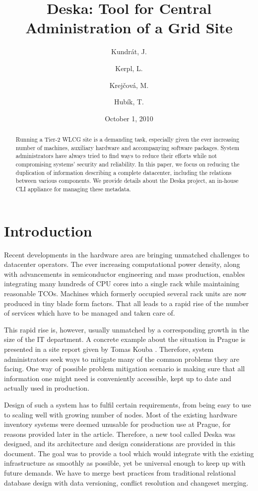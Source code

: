 \documentclass[11pt]{article}
\title{\sc Deska: Tool for Central Administration of a Grid Site}
\author{Kundrát, J.}
\author{Kerpl, L.}
\author{Krejčová, M.}
\author{Hubík, T.}
\affil{Institute of Physics of the AS CR, Prague, Czech Republic}
\date{October 1, 2010}
\begin{document}
\maketitle
 
\begin{abstract}
Running a Tier-2 WLCG site is a demanding task, especially given the ever
increasing number of machines, auxiliary hardware and accompanying software
packages.  System administrators have always tried to find ways to reduce their
efforts while not compromising systems' security and reliability.  In this
paper, we focus on reducing the duplication of information describing a complete
datacenter, including the relations between various components.  We provide
details about the Deska project, an in-house CLI appliance for managing these
metadata.
\end{abstract}


\section{Introduction}

Recent developments in the hardware area are bringing unmatched challenges to
datacenter operators.  The ever increasing computational power density, along
with advancements in semiconductor engineering and mass production, enables
integrating many hundreds of CPU cores into a single rack while maintaining
reasonable TCOs.  Machines which formerly occupied several rack units are now
produced in tiny blade form factors.  That all leads to a rapid rise of the
number of services which have to be managed and taken care of.

This rapid rise is, however, usually unmatched by a corresponding growth in the
size of the IT department.  A concrete example about the situation in Prague is
presented in a site report given by Tomas Kouba \cite{kouba}. Therefore, system
administrators seek ways to mitigate many of the common problems they are
facing.  One way of possible problem mitigation
scenario is making sure that all information one might need is conveniently
accessible, kept up to date and actually used in production.

Design of such a system has to fulfil certain requirements, from being easy to
use to scaling well with growing number of nodes.  Most of the existing hardware
inventory systems were deemed unusable for production use at Prague, for reasons
provided later in the article.  Therefore, a new tool called Deska was
designed, and its architecture and design considerations are provided in this
document.  The goal was to provide a tool which would integrate with the existing
infrastructure as smoothly as possible, yet be universal enough to keep up with
future demands.  We have to merge best practices from traditional relational
database design with data versioning, conflict resolution and changeset merging.
\end{document}
